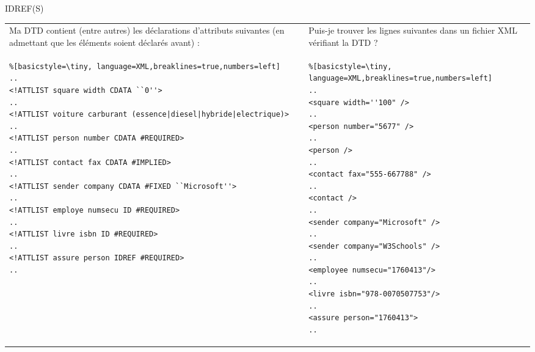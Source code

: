 \begin{frame}{IDREF(S)}
\lstset{numbers=left, basicstyle=\tiny}
\begin{tabular}{p{5.5cm} l p{4cm}}
Ma DTD contient (entre autres) les déclarations d'attributs suivantes (en admettant que les éléments soient déclarés avant) :
& &
Puis-je trouver les lignes suivantes dans un fichier XML vérifiant la DTD ?
\\
\begin{minipage}{0.5\textwidth}
\begin{lstlisting}%[basicstyle=\tiny, language=XML,breaklines=true,numbers=left]
..
<!ATTLIST square width CDATA ``0''>
..
<!ATTLIST voiture carburant (essence|diesel|hybride|electrique)> 
..
<!ATTLIST person number CDATA #REQUIRED>
..
<!ATTLIST contact fax CDATA #IMPLIED>
..
<!ATTLIST sender company CDATA #FIXED ``Microsoft''>
..
<!ATTLIST employe numsecu ID #REQUIRED>
..
<!ATTLIST livre isbn ID #REQUIRED>
..
<!ATTLIST assure person IDREF #REQUIRED>
..
\end{lstlisting}
\end{minipage}
& &
\begin{minipage}{0.35\textwidth}
\begin{lstlisting}%[basicstyle=\tiny, language=XML,breaklines=true,numbers=left]
..
<square width=''100" />
..
<person number="5677" />
..
<person />
..
<contact fax="555-667788" />
..
<contact />
..
<sender company="Microsoft" />
..
<sender company="W3Schools" />
..
<employee numsecu="1760413"/>
..
<livre isbn="978-0070507753"/>
..
<assure person="1760413">
..
\end{lstlisting}
\end{minipage}
\end{tabular}

\end{frame}

